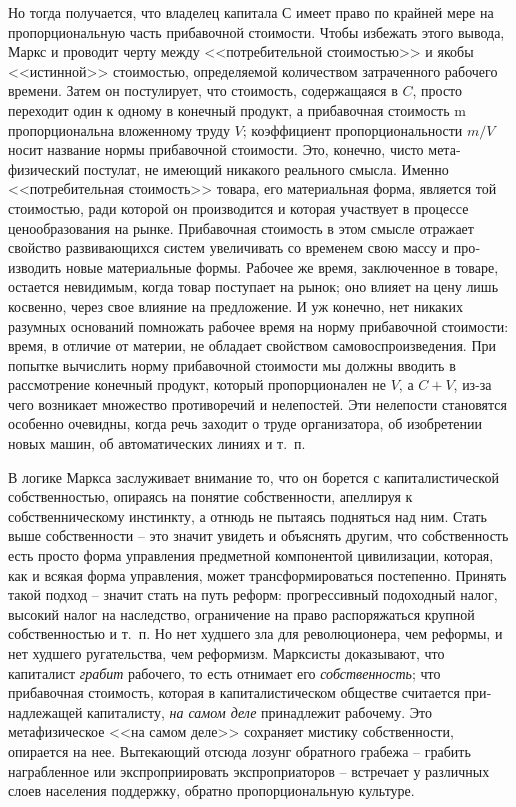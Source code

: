\documentclass{book}
\begin{document}
Но тогда получается, что владелец капитала С имеет право по крайней мере на пропорциональную часть прибавочной стои­мости. Чтобы избежать этого вывода, Маркс и проводит черту между <<потребительной стоимостью>> и якобы <<истинной>> стоимостью, определяемой количеством затраченного рабочего времени. Затем он постулирует, что стоимость, содержащаяся в $C$, просто переходит один к одному в конечный продукт, а прибавочная стоимость m  пропорциональна вложенному труду $V$; коэффициент пропорциональности $m/V$ носит назва­ние нормы прибавочной стоимости. Это, конечно, чисто мета­физический постулат, не имеющий никакого реального смысла. Именно <<потребительная стоимость>> товара, его материальная форма, является той стоимостью, ради которой он производит­ся и которая участвует в процессе ценообразования на рынке. Прибавочная стоимость в этом смысле отражает свойство раз­вивающихся систем увеличивать со временем свою массу и про­изводить новые материальные формы. Рабочее же время, заклю­ченное в товаре, остается 
невидимым, когда товар поступает на рынок; оно влияет на цену лишь косвенно, через свое влия­ние на предложение. И уж конечно, нет никаких разумных ос­нований помножать рабочее время на норму прибавочной сто­имости: время, в отличие от материи, не обладает свойством самовоспроизведения. При попытке вычислить норму приба­вочной стоимости мы должны вводить в рассмотрение конечный продукт, который пропорционален не $V$, а $C + V$, из-за чего возникает множество противоречий и нелепостей. Эти не­лепости становятся особенно очевидны, когда речь заходит о труде организатора, об изобретении новых машин, об автоматических линиях и т.~п.

В логике Маркса заслуживает внимание то, что он борется с капиталистической собственностью, опираясь на понятие соб­ственности, апеллируя к собственническому инстинкту, а отнюдь не пытаясь подняться над ним. Стать выше собственности -- это значит увидеть и объяснять другим, что собственность есть просто форма управления предметной компонентой цивилиза­ции, которая, как и всякая форма управления, может транс­формироваться постепенно. Принять такой подход -- значит стать на путь реформ: прогрессивный подоходный налог, высо­кий налог на наследство, ограничение на право распоряжаться крупной собственностью и т.~п. Но нет худшего зла для рево­люционера, чем реформы, и нет худшего ругательства, чем ре­формизм. Марксисты доказывают, что капиталист \textit{грабит}  рабо­чего, то есть отнимает его \textit{собственность};  что прибавочная сто­имость, которая в капиталистическом обществе считается при­надлежащей капиталисту, \textit{на самом деле}  принадлежит рабочему. Это метафизическое <<на самом деле>> сохраняет 
мистику собст­венности, 
опирается на нее. Вытекающий отсюда лозунг обрат­ного грабежа -- грабить награбленное или экспроприировать экспроприаторов -- встречает у различных слоев населения поддержку, обратно пропорциональную культуре.
\end{document}
